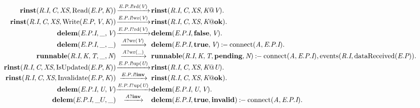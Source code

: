 \[
\begin{array}{r@{}c@{}l}
\\\Pfact{\Tstep{\Trinst{\Tr{\Tvar{R}}{\Tvar{I}}}{\Tvar{C}}{\Tvar{XS}}{\TrteRead{\Te{\Tvar{E}}{\Tvar{P}}}{\Tvar{K}}}}{\Tsay{\Tep{\Tvar{E}}{\Tvar{P}}{\Tvar{I}}}{\Trd{\Tvar{V}}}}{\Trinst{\Tr{\Tvar{R}}{\Tvar{I}}}{\Tvar{C}}{\Tvar{XS}}{\Tap{\Tvar{K}}{\Tvar{V}}}}}.
\\\Pfact{\Tstep{\Trinst{\Tr{\Tvar{R}}{\Tvar{I}}}{\Tvar{C}}{\Tvar{XS}}{\TrteWrite{\Te{\Tvar{E}}{\Tvar{P}}}{\Tvar{V}}{\Tvar{K}}}}{\Tsay{\Tep{\Tvar{E}}{\Tvar{P}}{\Tvar{I}}}{\Twr{\Tvar{V}}}}{\Trinst{\Tr{\Tvar{R}}{\Tvar{I}}}{\Tvar{C}}{\Tvar{XS}}{\Tap{\Tvar{K}}{\Tatom{ok}}}}}.
\\\Pfact{\Tstep{\Tdelem{\Tep{\Tvar{E}}{\Tvar{P}}{\Tvar{I}}}{\_}{\Tvar{V}}}{\Thear{\Tep{\Tvar{E}}{\Tvar{P}}{\Tvar{I}}}{\Trd{\Tvar{V}}}}{\Tdelem{\Tep{\Tvar{E}}{\Tvar{P}}{\Tvar{I}}}{\Tatom{false}}{\Tvar{V}}}}.
\\\Prule{\Tstep{\Tdelem{\Tep{\Tvar{E}}{\Tvar{P}}{\Tvar{I}}}{\_}{\_}}{\Thear{\Tvar{A}}{\Twr{\Tvar{V}}}}{\Tdelem{\Tep{\Tvar{E}}{\Tvar{P}}{\Tvar{I}}}{\Tatom{true}}{\Tvar{V}}}}{\Tconnect{\Tvar{A}}{\Tep{\Tvar{E}}{\Tvar{P}}{\Tvar{I}}}}.
\\\Prule{\Tstep{\Trunnable{\Tr{\Tvar{R}}{\Tvar{I}}}{\Tvar{K}}{\Tvar{T}}{\_}{\Tvar{N}}}{\Thear{\Tvar{A}}{\Twr{\_}}}{\Trunnable{\Tr{\Tvar{R}}{\Tvar{I}}}{\Tvar{K}}{\Tvar{T}}{\Tatom{pending}}{\Tvar{N}}}}{\Tconnect{\Tvar{A}}{\Tep{\Tvar{E}}{\Tvar{P}}{\Tvar{I}}},\Tevents{\Tr{\Tvar{R}}{\Tvar{I}}}{\TdataReceived{\Te{\Tvar{E}}{\Tvar{P}}}}}.
\\\Pfact{\Tstep{\Trinst{\Tr{\Tvar{R}}{\Tvar{I}}}{\Tvar{C}}{\Tvar{XS}}{\TrteIsUpdated{\Te{\Tvar{E}}{\Tvar{P}}}{\Tvar{K}}}}{\Tsay{\Tep{\Tvar{E}}{\Tvar{P}}{\Tvar{I}}}{\Tup{\Tvar{U}}}}{\Trinst{\Tr{\Tvar{R}}{\Tvar{I}}}{\Tvar{C}}{\Tvar{XS}}{\Tap{\Tvar{K}}{\Tvar{U}}}}}.
\\\Pfact{\Tstep{\Trinst{\Tr{\Tvar{R}}{\Tvar{I}}}{\Tvar{C}}{\Tvar{XS}}{\TrteInvalidate{\Te{\Tvar{E}}{\Tvar{P}}}{\Tvar{K}}}}{\Tsay{\Tep{\Tvar{E}}{\Tvar{P}}{\Tvar{I}}}{\Tatom{inv}}}{\Trinst{\Tr{\Tvar{R}}{\Tvar{I}}}{\Tvar{C}}{\Tvar{XS}}{\Tap{\Tvar{K}}{\Tatom{ok}}}}}.
\\\Pfact{\Tstep{\Tdelem{\Tep{\Tvar{E}}{\Tvar{P}}{\Tvar{I}}}{\Tvar{U}}{\Tvar{V}}}{\Thear{\Tep{\Tvar{E}}{\Tvar{P}}{\Tvar{I}}}{\Tup{\Tvar{U}}}}{\Tdelem{\Tep{\Tvar{E}}{\Tvar{P}}{\Tvar{I}}}{\Tvar{U}}{\Tvar{V}}}}.
\\\Prule{\Tstep{\Tdelem{\Tep{\Tvar{E}}{\Tvar{P}}{\Tvar{I}}}{\_U}{\_}}{\Thear{\Tvar{A}}{\Tatom{inv}}}{\Tdelem{\Tep{\Tvar{E}}{\Tvar{P}}{\Tvar{I}}}{\Tatom{true}}{\Tatom{invalid}}}}{\Tconnect{\Tvar{A}}{\Tep{\Tvar{E}}{\Tvar{P}}{\Tvar{I}}}}.
\end{array}
\]
